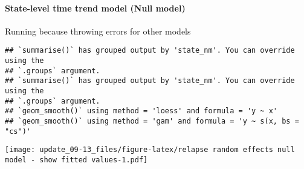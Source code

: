\documentclass[
]{article}
\begin{document}
\newpage

\hypertarget{state-level-time-trend-model-null-model}{%
\paragraph{State-level time trend model (Null
model)}\label{state-level-time-trend-model-null-model}}

Running because throwing errors for other models

\begin{verbatim}
## `summarise()` has grouped output by 'state_nm'. You can override using the
## `.groups` argument.
## `summarise()` has grouped output by 'state_nm'. You can override using the
## `.groups` argument.
## `geom_smooth()` using method = 'loess' and formula = 'y ~ x'
## `geom_smooth()` using method = 'gam' and formula = 'y ~ s(x, bs = "cs")'
\end{verbatim}

\texttt{[image: update\_09-13\_files/figure-latex/relapse random effects null model - show fitted values-1.pdf]}
\end{document}
